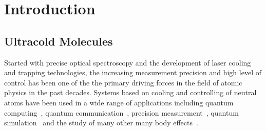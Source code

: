 
\chapter{Introduction}
\label{ch:introduction}

\section{Ultracold Molecules}
\label{ch:introduction:molecules}

Started with precise optical spectroscopy and the development of laser cooling
and trapping technologies, the increasing measurement precision and
high level of control has been one of the the primary driving forces
in the field of atomic physics in the past decades.
Systems based on cooling and controlling of neutral atoms
have been used in a wide range of applications including
quantum computing~\cite{wang_single-qubit_2016,anderlini_controlled_2007,
  kaufman_entangling_2015,levine_high-fidelity_2018,isenhower_demonstration_2010},
quantum communication~\cite{tiecke_nanophotonic_2014,reiserer_quantum_2014,
  welte_photon-mediated_2018},
precision measurement~\cite{bloom_optical_2014,parker_measurement_2018},
quantum simulation~\cite{bakr_quantum_2009,cheuk_quantum-gas_2015,bernien_probing_2017,
  leseleuc_observation_2019,koepsell_imaging_2019,chiu_string_2019,
  bloch_many-body_2008,lahaye_physics_2009}
and the study of many other many body effects~\cite{weiner_experiments_1999,
  sompet_thermally_2019,xu_interaction-induced_2015,guan_density_2019,
  dimitrova_observation_2017}.

